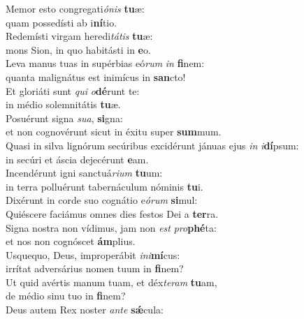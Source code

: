 \evenverse Memor esto congregati\textit{ó}\textit{nis} \textbf{tu}æ:~\*\\
\evenverse quam possedísti ab i\textbf{ní}tio.\\
\oddverse Redemísti virgam heredi\textit{tá}\textit{tis} \textbf{tu}æ:~\*\\
\oddverse mons Sion, in quo habitásti in \textbf{e}o.\\
\evenverse Leva manus tuas in supérbias eó\textit{rum} \textit{in} \textbf{fi}nem:~\*\\
\evenverse quanta malignátus est inimícus in \textbf{san}cto!\\
\oddverse Et gloriáti sunt \textit{qui} \textit{o}\textbf{dé}runt te:~\*\\
\oddverse in médio solemnitátis \textbf{tu}æ.\\
\evenverse Posuérunt signa \textit{su}\textit{a}, \textbf{si}gna:~\*\\
\evenverse et non cognovérunt sicut in éxitu super \textbf{sum}mum.\\
\oddverse Quasi in silva lignórum secúribus excidérunt jánuas ejus \textit{in} \textit{i}\textbf{dí}psum:~\*\\
\oddverse in secúri et áscia dejecérunt \textbf{e}am.\\
\evenverse Incendérunt igni sanctuá\textit{ri}\textit{um} \textbf{tu}um:~\*\\
\evenverse in terra polluérunt tabernáculum nóminis \textbf{tu}i.\\
\oddverse Dixérunt in corde suo cognátio e\textit{ó}\textit{rum} \textbf{si}mul:~\*\\
\oddverse Quiéscere faciámus omnes dies festos Dei a \textbf{ter}ra.\\
\evenverse Signa nostra non vídimus, jam non \textit{est} \textit{pro}\textbf{phé}ta:~\*\\
\evenverse et nos non cognóscet \textbf{ám}plius.\\
\oddverse Usquequo, Deus, improperábit \textit{i}\textit{ni}\textbf{mí}cus:~\*\\
\oddverse irrítat adversárius nomen tuum in \textbf{fi}nem?\\
\evenverse Ut quid avértis manum tuam, et déx\textit{te}\textit{ram} \textbf{tu}am,~\*\\
\evenverse de médio sinu tuo in \textbf{fi}nem?\\
\oddverse Deus autem Rex noster \textit{an}\textit{te} \textbf{sǽ}cula:~\*\\
